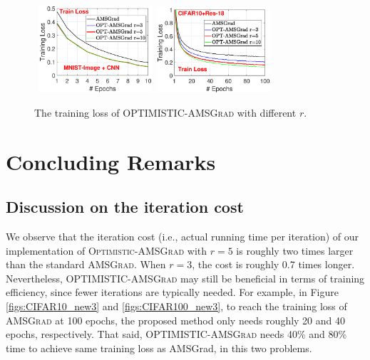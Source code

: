 \documentclass[11pt]{article}
\theoremstyle{k}
\begin{document}
\begin{figure}[]
\begin{center}
\mbox{
\includegraphics[width=1.65in]{./new_figure/new_mnist_img_figure/mnist_img_train_loss_r3510_2.eps}\hspace{-0.1in}
\includegraphics[width=1.65in]{./new_figure/cifar10_train_loss_r3510.eps}
}
\end{center}
\vspace{-0.1in}
\caption{The training loss of \textsc{OPTIMISTIC-AMSGrad} with different $r$.}     \label{fig:compare-r}
\end{figure}


\section{Concluding Remarks}
\subsection{Discussion on the iteration cost}

We observe that the iteration cost (i.e., actual running time per iteration) of our implementation of \textsc{Optimistic-AMSGrad} with $r=5$ is roughly two times larger than the standard \textsc{AMSGrad}. When $r=3$, the cost is roughly 0.7 times longer. Nevertheless, \textsc{OPTIMISTIC-AMSGrad} may still be beneficial in terms of training efficiency, since fewer iterations are typically needed. For example, in Figure \ref{figs:CIFAR10_new3} and \ref{figs:CIFAR100_new3}, to reach the training loss of \textsc{AMSGrad} at 100 epochs, the proposed method only needs roughly 20 and 40 epochs, respectively. That said, \textsc{OPTIMISTIC-AMSGrad} needs 40\% and 80\% time to achieve same training loss as \textsf{AMSGrad}, in this two problems.
\end{document}
